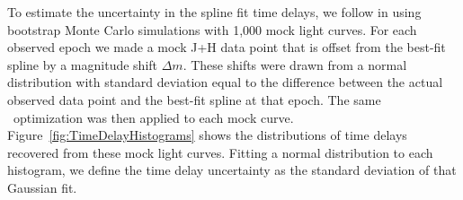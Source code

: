 To estimate the uncertainty in the spline fit time delays, we follow \citet{Tewes:2013a} in using bootstrap Monte Carlo simulations with 1,000 mock light curves.  For each observed epoch we made a mock J+H data point that is offset from the best-fit spline by a magnitude shift $\Delta m$.  These shifts were drawn from a normal distribution with standard deviation equal to the difference between the actual observed data point and the best-fit spline at that epoch.  The same \pycs\ optimization was then applied to each mock curve.  Figure~\ref{fig:TimeDelayHistograms} shows the distributions of time delays recovered from these mock light curves.  Fitting a normal distribution to each histogram, we define the time delay uncertainty as the standard deviation of that Gaussian fit.




 



